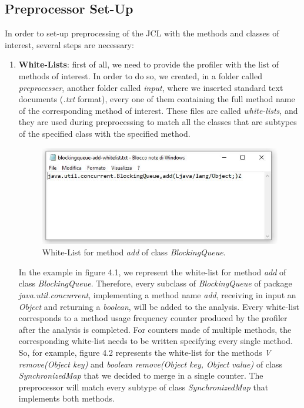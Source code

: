 \documentclass[]{usiinfthesis}
\begin{document}
\subsection{Preprocessor Set-Up}
In order to set-up preprocessing of the JCL with the methods and classes of interest, several steps are necessary:
\begin{enumerate}
    \item \textbf{White-Lists}: first of all, we need to provide the profiler with the list of methods of interest. In order to do so, we created, in a folder called \textit{preprocesser}, another folder called \textit{input}, where we inserted standard text documents (\textit{.txt} format), every one of them containing the full method name of the corresponding method of interest. These files are called \textit{white-lists}, and they are used during preprocessing to match all the classes that are subtypes of the specified class with the specified method.
    \vspace{0.5cm}
    \begin{figure}[h]
        \centering
        \includegraphics[scale=0.7]{Immagini/whitelist.JPG} 
        \caption{White-List for method \textit{add} of class \textit{BlockingQueue}.}
        \label{fig:fig1}
    \end{figure}
    \vspace{0.5cm}
    \newline In the example in figure 4.1, we represent the white-list for method \textit{add} of class \textit{BlockingQueue}. Therefore, every subclass of \textit{BlockingQueue} of package \textit{java.util.concurrent}, implementing a method name \textit{add}, receiving in input an \textit{Object} and returning a \textit{boolean}, will be added to the analysis.
    \newline Every white-list corresponds to a method usage frequency counter produced by the profiler after the analysis is completed.  For counters made of multiple methods, the corresponding white-list needs to be written specifying every single method. So, for example, figure 4.2 represents the white-list for the methods \textit{V remove(Object key)} and \textit{boolean remove(Object key, Object value)} of class \textit{SynchronizedMap} that we decided to merge in a single counter. The preprocessor will match every subtype of class \textit{SynchronizedMap} that implements both methods.

\end{enumerate}
\end{document}
